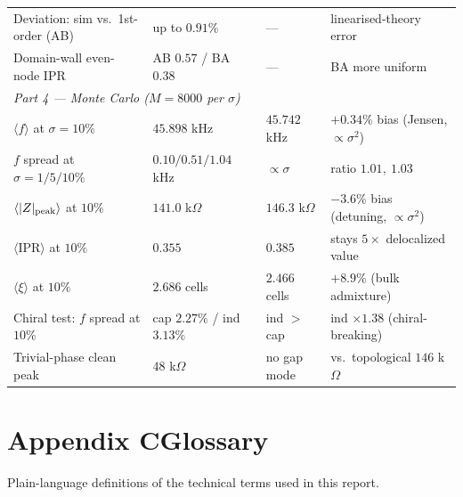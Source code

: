 \documentclass[11pt]{article}
\begin{document}
\begin{longtable}{p{4.9cm}p{3.0cm}p{3.0cm}p{4.4cm}}
Deviation: sim vs.\ 1st-order (AB) & up to $0.91\%$ & --- & linearised-theory error\\
Domain-wall even-node IPR & AB $0.57$ / BA $0.38$ & --- & BA more uniform\\
\midrule
\multicolumn{4}{l}{\textit{Part 4 --- Monte Carlo ($M=8000$ per $\sigma$)}}\\
$\langle f\rangle$ at $\sigma=10\%$ & $45.898$ kHz & $45.742$ kHz & $+0.34\%$ bias (Jensen, $\propto\sigma^2$)\\
$f$ spread at $\sigma=1/5/10\%$ & $0.10/0.51/1.04$ kHz & $\propto\sigma$ & ratio $1.01,\ 1.03$\\
$\langle|Z|_{\rm peak}\rangle$ at $10\%$ & $141.0$ k$\Omega$ & $146.3$ k$\Omega$ & $-3.6\%$ bias (detuning, $\propto\sigma^2$)\\
$\langle$IPR$\rangle$ at $10\%$ & $0.355$ & $0.385$ & stays $5\times$ delocalized value\\
$\langle\xi\rangle$ at $10\%$ & $2.686$ cells & $2.466$ cells & $+8.9\%$ (bulk admixture)\\
Chiral test: $f$ spread at $10\%$ & cap $2.27\%$ / ind $3.13\%$ & ind $>$ cap & ind $\times1.38$ (chiral-breaking)\\
Trivial-phase clean peak  & $48$ k$\Omega$ & no gap mode & vs.\ topological $146$ k$\Omega$\\
\bottomrule
\end{longtable}

\clearpage
\section*{Appendix C\quad Glossary}
\small
Plain-language definitions of the technical terms used in this report.
\end{document}
